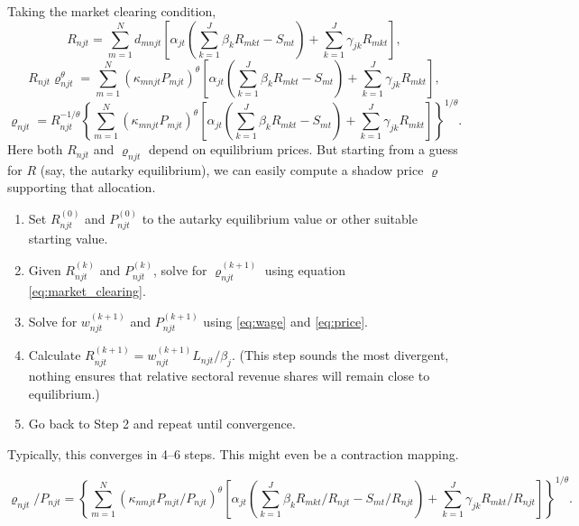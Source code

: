 \documentclass{article}
\begin{document}
Taking the market clearing condition,
\begin{equation}
	R_{njt} = \sum_{m=1}^N
		d_{mnjt}
		\left[
			\alpha_{jt}
			\left(
				\sum_{k=1}^J\beta_k R_{mkt} - S_{mt}
			\right)
			+ \sum_{k=1}^J\gamma_{jk}R_{mkt}
		\right],
\end{equation}
\[
	R_{njt}\varrho_{njt}^{\theta} = \sum_{m=1}^N
		(\kappa_{mnjt} P_{mjt})^{\theta}
		\left[
			\alpha_{jt}
			\left(
				\sum_{k=1}^J\beta_k R_{mkt} - S_{mt}
			\right)
			+ \sum_{k=1}^J\gamma_{jk}R_{mkt}
		\right],
\]
\begin{equation}\label{eq:market_clearing}
	\varrho_{njt} = R_{njt}^{-1/\theta}
	\left\{
	\sum_{m=1}^N
		(\kappa_{mnjt} P_{mjt})^{\theta}
		\left[
			\alpha_{jt}
			\left(
				\sum_{k=1}^J\beta_k R_{mkt} - S_{mt}
			\right)
			+ \sum_{k=1}^J\gamma_{jk}R_{mkt}
		\right]
	\right\}^{1/\theta}.
\end{equation}
Here both $R_{njt}$ and $\varrho_{njt}$ depend on equilibrium prices. But starting from a guess for $R$ (say, the autarky equilibrium), we can easily compute a shadow price $\varrho$ supporting that allocation. 
\begin{enumerate}
	\item Set $R_{njt}^{(0)}$ and $P_{njt}^{(0)}$ to the autarky equilibrium value or other suitable starting value.
	\item Given $R_{njt}^{(k)}$ and $P_{njt}^{(k)}$, solve for $\varrho_{njt}^{(k+1)}$ using equation \eqref{eq:market_clearing}.
	\item Solve for $w_{njt}^{(k+1)}$ and $P_{njt}^{(k+1)}$ using \eqref{eq:wage} and \eqref{eq:price}.
	\item Calculate $R_{njt}^{(k+1)} = w_{njt}^{(k+1)}L_{njt}/\beta_j$. (This step sounds the most divergent, nothing ensures that relative sectoral revenue shares will remain close to equilibrium.)
	\item Go back to Step 2 and repeat until convergence.
\end{enumerate}
Typically, this converges in 4--6 steps. This might even be a contraction mapping. 

\begin{equation*}
	\varrho_{njt}/P_{njt} = 
	\left\{
	\sum_{m=1}^N
		(\kappa_{nmjt} P_{mjt}/P_{njt})^{\theta}
		\left[
			\alpha_{jt}
			\left(
				\sum_{k=1}^J\beta_k R_{mkt}/R_{njt} - S_{mt}/R_{njt}
			\right)
			+ \sum_{k=1}^J\gamma_{jk}R_{mkt}/R_{njt}
		\right]
	\right\}^{1/\theta}.
\end{equation*}
\end{document}
